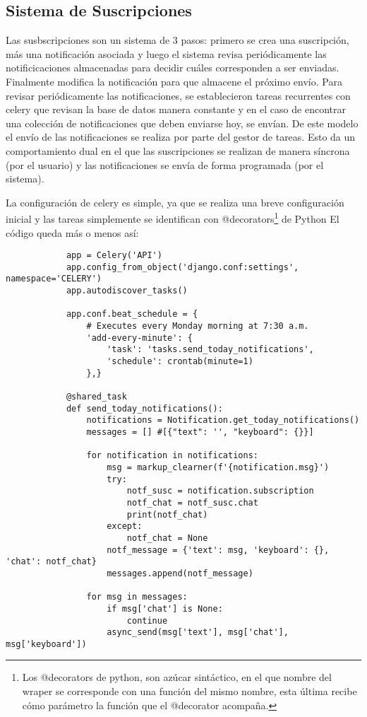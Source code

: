     \subsection{Sistema de Suscripciones}
        \par Las susbscripciones son un sistema de 3 pasos: primero se crea una suscripción, más una notificación asociada y luego el sistema revisa periódicamente las notificicaciones almacenadas para decidir cuáles corresponden a ser enviadas. Finalmente modifica la notificación para que almacene el próximo envío.
        Para revisar periódicamente las notificaciones, se establecieron tareas recurrentes con celery que revisan la base de datos manera constante y en el caso de encontrar una colección de notificaciones que deben enviarse hoy, se envían. 
        De este modelo el envío de las notificaciones se realiza por parte del gestor de tareas.
        Esto da un comportamiento dual en el que las suscripciones se realizan de manera síncrona (por el usuario) y las notificaciones se envía de forma programada (por el sistema).
        \par La configuración de celery es simple, ya que se realiza una breve configuración inicial y las tareas simplemente se identifican con @decorators\footnote{ Los @decorators de python, son azúcar sintáctico, en el que nombre del wraper se corresponde con una función del mismo nombre, esta última recibe cómo parámetro la función que el @decorator acompaña.} de Python  
        El código queda más o menos así:

        \begin{verbatim}
            app = Celery('API')
            app.config_from_object('django.conf:settings', namespace='CELERY')
            app.autodiscover_tasks()

            app.conf.beat_schedule = {
                # Executes every Monday morning at 7:30 a.m.
                'add-every-minute': {
                    'task': 'tasks.send_today_notifications',
                    'schedule': crontab(minute=1)
                },}

            @shared_task
            def send_today_notifications():
                notifications = Notification.get_today_notifications()
                messages = [] #[{"text": '', "keyboard": {}}]
                
                for notification in notifications:
                    msg = markup_clearner(f'{notification.msg}')
                    try:
                        notf_susc = notification.subscription
                        notf_chat = notf_susc.chat
                        print(notf_chat)
                    except:
                        notf_chat = None
                    notf_message = {'text': msg, 'keyboard': {}, 'chat': notf_chat}
                    messages.append(notf_message)

                for msg in messages:
                    if msg['chat'] is None:
                        continue
                    async_send(msg['text'], msg['chat'], msg['keyboard'])
        \end{verbatim}

